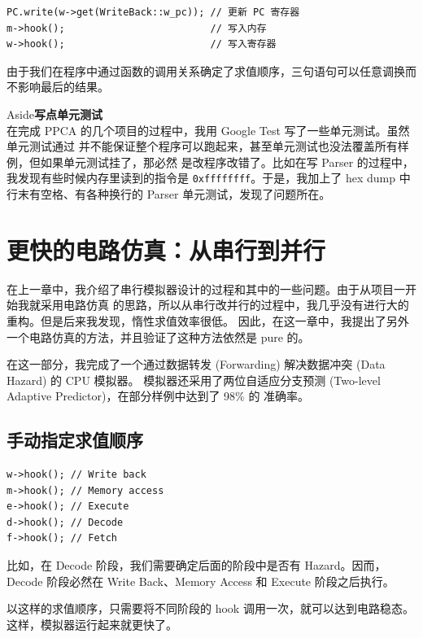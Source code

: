 \documentclass[12pt]{article}
\newenvironment{aside}[1]
    { \begin{tcolorbox}[enlarge top by=0.5cm, enlarge bottom by=0.5cm] Aside\space\space\space\space \textbf{#1} \\
        } { \end{tcolorbox} }
\begin{document}
    \begin{verbatim}
PC.write(w->get(WriteBack::w_pc)); // 更新 PC 寄存器
m->hook();                         // 写入内存
w->hook();                         // 写入寄存器
    \end{verbatim}

    由于我们在程序中通过函数的调用关系确定了求值顺序，三句语句可以任意调换而不影响最后的结果。

    \begin{aside}{写点单元测试}
        在完成 PPCA 的几个项目的过程中，我用 Google Test 写了一些单元测试。虽然单元测试通过
        并不能保证整个程序可以跑起来，甚至单元测试也没法覆盖所有样例，但如果单元测试挂了，那必然
        是改程序改错了。比如在写 Parser 的过程中，我发现有些时候内存里读到的指令是 
        \texttt{0xffffffff}。于是，我加上了 hex dump 中行末有空格、有各种换行的 Parser
        单元测试，发现了问题所在。
    \end{aside}

    \section{更快的电路仿真：从串行到并行}

    在上一章中，我介绍了串行模拟器设计的过程和其中的一些问题。由于从项目一开始我就采用电路仿真
    的思路，所以从串行改并行的过程中，我几乎没有进行大的重构。但是后来我发现，惰性求值效率很低。
    因此，在这一章中，我提出了另外一个电路仿真的方法，并且验证了这种方法依然是 pure 的。
    
    在这一部分，我完成了一个通过数据转发 (Forwarding) 解决数据冲突 (Data Hazard) 的 CPU 模拟器。
    模拟器还采用了两位自适应分支预测 (Two-level Adaptive Predictor)，在部分样例中达到了 98\% 的
    准确率。

    \subsection{手动指定求值顺序}

    \begin{verbatim}
w->hook(); // Write back
m->hook(); // Memory access
e->hook(); // Execute
d->hook(); // Decode
f->hook(); // Fetch
    \end{verbatim}

    比如，在 Decode 阶段，我们需要确定后面的阶段中是否有 Hazard。因而，Decode 阶段必然在 Write Back、Memory Access 和 Execute 阶段之后执行。

    以这样的求值顺序，只需要将不同阶段的 hook 调用一次，就可以达到电路稳态。这样，模拟器运行起来就更快了。
\end{document}
